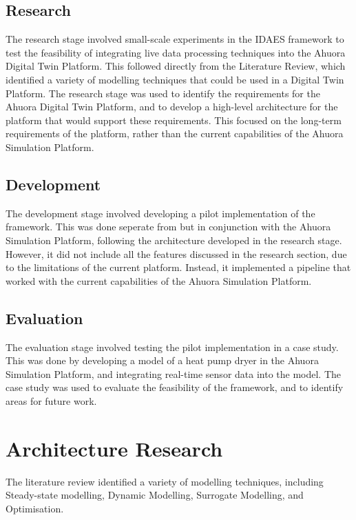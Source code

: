 \documentclass[12pt]{report}
\begin{document}
\section{Research}

The research stage involved small-scale experiments in the IDAES framework to test the feasibility of integrating live data processing techniques into the Ahuora Digital Twin Platform. This followed directly from the Literature Review, which identified a variety of modelling techniques that could be used in a Digital Twin Platform. The research stage was used to identify the requirements for the Ahuora Digital Twin Platform, and to develop a high-level architecture for the platform that would support these requirements. This focused on the long-term requirements of the platform, rather than the current capabilities of the Ahuora Simulation Platform.

\section{Development}

The development stage involved developing a pilot implementation of the framework. This was done seperate from but in conjunction with the Ahuora Simulation Platform, following the architecture developed in the research stage. However, it did not include all the features discussed in the research section, due to the limitations of the current platform. Instead, it implemented a pipeline that worked with the current capabilities of the Ahuora Simulation Platform.

\section{Evaluation}

The evaluation stage involved testing the pilot implementation in a case study. This was done by developing a model of a heat pump dryer in the Ahuora Simulation Platform, and integrating real-time sensor data into the model. The case study was used to evaluate the feasibility of the framework, and to identify areas for future work.

\chapter{Architecture Research}

The literature review identified a variety of modelling techniques, including Steady-state modelling, Dynamic Modelling, Surrogate Modelling, and Optimisation. 
\end{document}
